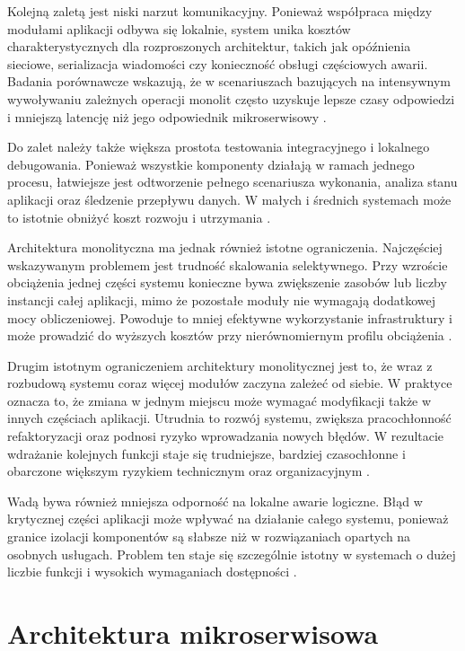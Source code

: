 Kolejną zaletą jest niski narzut komunikacyjny. Ponieważ współpraca między modułami aplikacji odbywa się lokalnie, system unika kosztów charakterystycznych dla rozproszonych architektur, takich jak opóźnienia sieciowe, serializacja wiadomości czy konieczność obsługi częściowych awarii. Badania porównawcze wskazują, że w scenariuszach bazujących na intensywnym wywoływaniu zależnych operacji monolit często uzyskuje lepsze czasy odpowiedzi i mniejszą latencję niż jego odpowiednik mikroserwisowy \cite{bass2021software}.

Do zalet należy także większa prostota testowania integracyjnego i lokalnego debugowania. Ponieważ wszystkie komponenty działają w ramach jednego procesu, łatwiejsze jest odtworzenie pełnego scenariusza wykonania, analiza stanu aplikacji oraz śledzenie przepływu danych. W małych i średnich systemach może to istotnie obniżyć koszt rozwoju i utrzymania \cite{nayim2023ecommerce}.

Architektura monolityczna ma jednak również istotne ograniczenia. Najczęściej wskazywanym problemem jest trudność skalowania selektywnego. Przy wzroście obciążenia jednej części systemu konieczne bywa zwiększenie zasobów lub liczby instancji całej aplikacji, mimo że pozostałe moduły nie wymagają dodatkowej mocy obliczeniowej. Powoduje to mniej efektywne wykorzystanie infrastruktury i może prowadzić do wyższych kosztów przy nierównomiernym profilu obciążenia \cite{electronics13081452}.

Drugim istotnym ograniczeniem architektury monolitycznej jest to, że wraz z rozbudową systemu coraz więcej modułów zaczyna zależeć od siebie. W praktyce oznacza to, że zmiana w jednym miejscu może wymagać modyfikacji także w innych częściach aplikacji. Utrudnia to rozwój systemu, zwiększa pracochłonność refaktoryzacji oraz podnosi ryzyko wprowadzania nowych błędów. W rezultacie wdrażanie kolejnych funkcji staje się trudniejsze, bardziej czasochłonne i obarczone większym ryzykiem technicznym oraz organizacyjnym \cite{saucedo2025migration}.

Wadą bywa również mniejsza odporność na lokalne awarie logiczne. Błąd w krytycznej części aplikacji może wpływać na działanie całego systemu, ponieważ granice izolacji komponentów są słabsze niż w rozwiązaniach opartych na osobnych usługach. Problem ten staje się szczególnie istotny w systemach o dużej liczbie funkcji i wysokich wymaganiach dostępności \cite{oumoussa2025ontology}.

\section{Architektura mikroserwisowa}
\label{sec:microservices-architecture}

